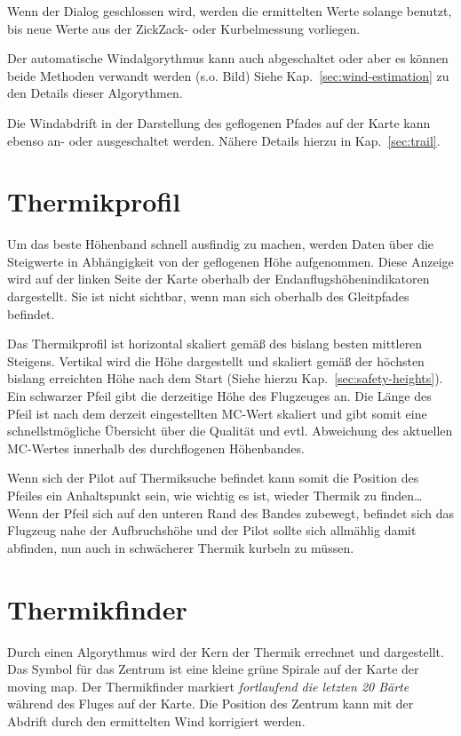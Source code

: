 Wenn der Dialog geschlossen wird, werden die ermittelten Werte solange benutzt,
 bis neue Werte aus der ZickZack- oder Kurbelmessung vorliegen.

Der automatische Windalgorythmus kann auch abgeschaltet oder aber es können
beide Methoden verwandt werden (s.o. Bild) Siehe Kap.~\ref{sec:wind-estimation}
zu den Details dieser Algorythmen.

Die Windabdrift in der Darstellung des geflogenen Pfades  auf der Karte kann ebenso an-
oder ausgeschaltet werden. Nähere Details hierzu in Kap.~\ref{sec:trail}.
\section{Thermikprofil}
Um das beste Höhenband schnell ausfindig zu machen, werden Daten über die Steigwerte in
Abhängigkeit von der geflogenen Höhe aufgenommen.
Diese Anzeige wird auf der linken Seite der Karte oberhalb der Endanflugshöhenindikatoren dargestellt.
Sie ist nicht sichtbar, wenn man sich oberhalb des Gleitpfades befindet.

Das Thermikprofil ist horizontal skaliert gemäß des bislang besten mittleren Steigens.
Vertikal wird die Höhe dargestellt und skaliert gemäß der höchsten bislang erreichten Höhe nach dem Start
(Siehe hierzu Kap.~\ref{sec:safety-heights}). Ein schwarzer Pfeil gibt die derzeitige Höhe des Flugzeuges an.
Die Länge des  Pfeil ist nach dem derzeit eingestellten MC-Wert skaliert und gibt somit eine schnellstmögliche Übersicht über die Qualität und evtl. Abweichung des aktuellen MC-Wertes innerhalb des durchflogenen Höhenbandes.

Wenn sich der Pilot auf Thermiksuche befindet kann somit die Position des Pfeiles ein Anhaltspunkt sein,
wie wichtig es ist, wieder Thermik zu finden\dots
Wenn der Pfeil sich auf den unteren Rand des Bandes zubewegt, befindet sich das Flugzeug nahe der Aufbruchshöhe und der Pilot sollte sich allmählig damit abfinden, nun auch in schwächerer Thermik kurbeln zu müssen.

\section{Thermikfinder}
Durch einen Algorythmus wird der Kern der Thermik errechnet und dargestellt.
Das Symbol für das Zentrum ist eine kleine grüne Spirale auf der Karte der moving map.
Der Thermikfinder markiert \textit{fortlaufend  die letzten 20 Bärte} während des Fluges auf der Karte.
Die Position des Zentrum kann mit der Abdrift durch den ermittelten Wind korrigiert werden.

